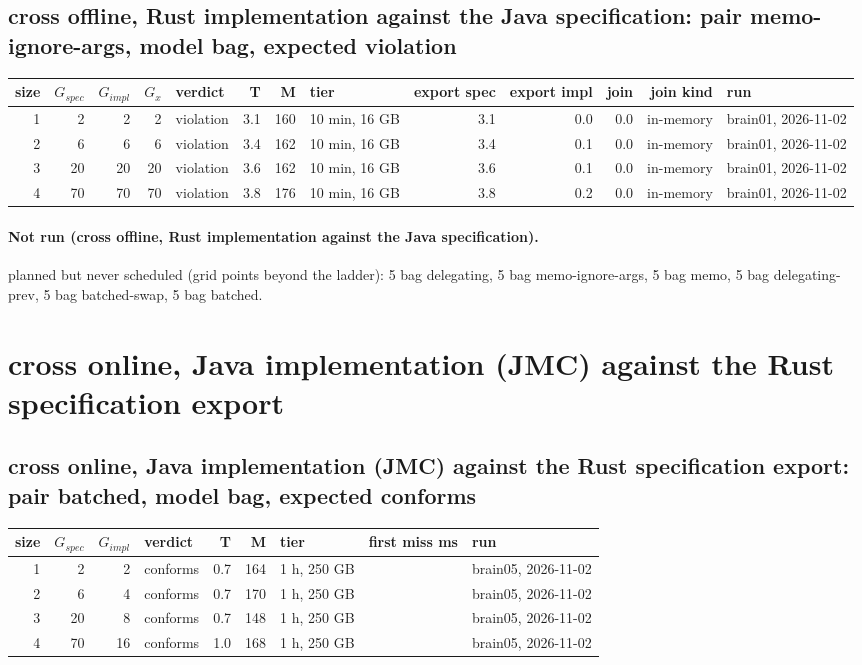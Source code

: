 \documentclass[10pt]{article}
\begin{document}
\subsection*{cross offline, Rust implementation against the Java specification: pair \textsf{memo-ignore-args}, model bag, expected violation}
\begin{longtable}{@{}rrrrlrrlrrrrl@{}}
\toprule
size & $G_{\mathit{spec}}$ & $G_{\mathit{impl}}$ & $G_x$ & verdict & T & M & tier & export spec & export impl & join & join kind & run \\
\midrule
\endhead
\color{red} 1 & 2 & 2 & 2 & violation & 3.1 & 160 & 10 min, 16 GB & 3.1 & 0.0 & 0.0 & in-memory & brain01, 2026-11-02 \\
\color{red} 2 & 6 & 6 & 6 & violation & 3.4 & 162 & 10 min, 16 GB & 3.4 & 0.1 & 0.0 & in-memory & brain01, 2026-11-02 \\
\color{red} 3 & 20 & 20 & 20 & violation & 3.6 & 162 & 10 min, 16 GB & 3.6 & 0.1 & 0.0 & in-memory & brain01, 2026-11-02 \\
\color{red} 4 & 70 & 70 & 70 & violation & 3.8 & 176 & 10 min, 16 GB & 3.8 & 0.2 & 0.0 & in-memory & brain01, 2026-11-02 \\
\bottomrule
\end{longtable}
\paragraph{Not run (cross offline, Rust implementation against the Java specification).}
planned but never scheduled (grid points beyond the ladder): 5 bag delegating, 5 bag memo-ignore-args, 5 bag memo, 5 bag delegating-prev, 5 bag batched-swap, 5 bag batched.\par
\section*{cross online, Java implementation (JMC) against the Rust specification export}
\subsection*{cross online, Java implementation (JMC) against the Rust specification export: pair \textsf{batched}, model bag, expected conforms}
\begin{longtable}{@{}rrrlrrlrl@{}}
\toprule
size & $G_{\mathit{spec}}$ & $G_{\mathit{impl}}$ & verdict & T & M & tier & first miss ms & run \\
\midrule
\endhead
\color{red} 1 & 2 & 2 & conforms & 0.7 & 164 & 1 h, 250 GB &  & brain05, 2026-11-02 \\
\color{red} 2 & 6 & 4 & conforms & 0.7 & 170 & 1 h, 250 GB &  & brain05, 2026-11-02 \\
\color{red} 3 & 20 & 8 & conforms & 0.7 & 148 & 1 h, 250 GB &  & brain05, 2026-11-02 \\
\color{red} 4 & 70 & 16 & conforms & 1.0 & 168 & 1 h, 250 GB &  & brain05, 2026-11-02 \\
\bottomrule
\end{longtable}
\end{document}
